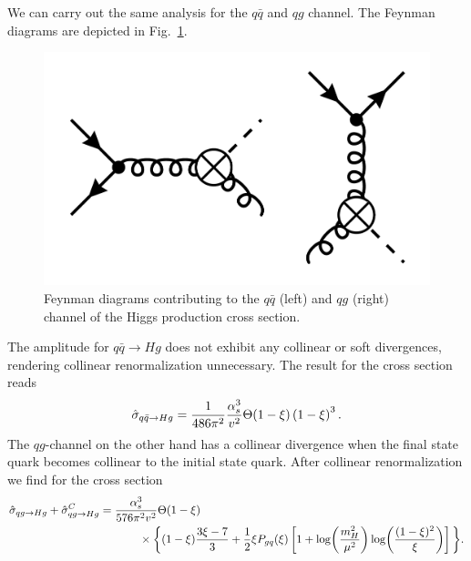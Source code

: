 We can carry out the same analysis for the $q \bar{q}$ and $q g$ channel. The Feynman diagrams are depicted in Fig.~\ref{fig:4:qqHg}.
\begin{figure}[h]
\centering
\includegraphics[scale=0.15]{Images/NLO_Feynman_diagrams/qqHg.pdf}
\caption{Feynman diagrams contributing to the $q \bar{q}$ (left) and $q g$ (right) channel of the Higgs production cross section.}
\label{fig:4:qqHg}
\end{figure}
The amplitude for $q \bar{q} \rightarrow H g$ does not exhibit any collinear or soft divergences, rendering collinear renormalization unnecessary. The result for the cross section reads
\begin{equation}
\hat{\sigma}_{q \bar{q} \rightarrow H g} = \frac{1}{486 \pi^2} \frac{\alpha_s^3}{v^2} \Theta (1 - \xi) \left(1 - \xi \right)^3.
\end{equation}
The $qg$-channel on the other hand has a collinear divergence when the final state quark becomes collinear to the initial state quark. After collinear renormalization we find for the cross section
\begin{equation}
\begin{split}
&\hat{\sigma}_{qg \rightarrow Hg} + \hat{\sigma}_{qg \rightarrow Hg}^C = \frac{\alphas^3}{576 \pi^2 v^2} \Theta (1 - \xi) \\
& \hspace{4cm} \times \bigg \lbrace (1 - \xi) \frac{3 \xi - 7}{3} + \frac{1}{2} \xi P_{gq}(\xi) \left[1 + \log\!\left(\frac{m_H^2}{\mu^2} \right) \log\!\left(\frac{(1 - \xi)^2}{\xi} \right) \right] \bigg \rbrace.
\end{split}
\end{equation}


